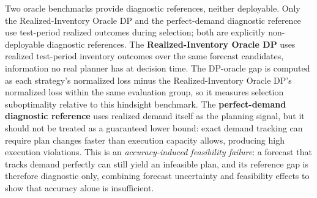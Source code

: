 Two oracle benchmarks provide diagnostic references, neither deployable. Only the Realized-Inventory Oracle DP and the perfect-demand diagnostic reference use test-period realized outcomes during selection; both are explicitly non-deployable diagnostic references. The \textbf{Realized-Inventory Oracle DP} uses realized test-period inventory outcomes over the same forecast candidates, information no real planner has at decision time. The DP-oracle gap is computed as each strategy's normalized loss minus the Realized-Inventory Oracle DP's normalized loss within the same evaluation group, so it measures selection suboptimality relative to this hindsight benchmark. The \textbf{perfect-demand diagnostic reference} uses realized demand itself as the planning signal, but it should not be treated as a guaranteed lower bound: exact demand tracking can require plan changes faster than execution capacity allows, producing high execution violations. This is an \emph{accuracy-induced feasibility failure}: a forecast that tracks demand perfectly can still yield an infeasible plan, and its reference gap is therefore diagnostic only, combining forecast uncertainty and feasibility effects to show that accuracy alone is insufficient.
